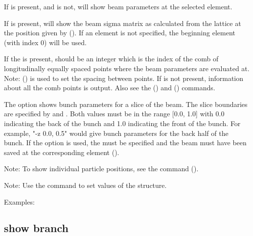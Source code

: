 {{{{{{{{If  is present, and  is not,  will show beam
parameters at the selected element. 

If  is present,  will show the beam sigma matrix as calculated from the
lattice at the position given by  (). If an
element is not specified, the beginning element (with index 0) will be used.

If the  is present,  should be an integer which is the index of the comb
of longitudinally equally spaced points where the beam parameters are evaluated at.  Note:
 () is used to set the spacing between points.  If
 is not present, information about all the comb points is output. Also see the
 () and  ()
commands.

The  option shows bunch parameters for a slice of the beam. The slice boundaries
are specified by  and . Both values must be in the range [0.0, 1.0] with 0.0
indicating the back of the bunch and 1.0 indicating the front of the bunch. For example, "-z 0.0,
0.5" would give bunch parameters for the back half of the bunch. If the  option is used,
the  must be specified and the beam must have been saved at the corresponding
element ().

Note: To show individual particle positions, see the  command
().

Note: Use the  command to set values of the  structure.

Examples:


\subsection{show branch}
\label{s:show.branch}

}}}}}}}}
